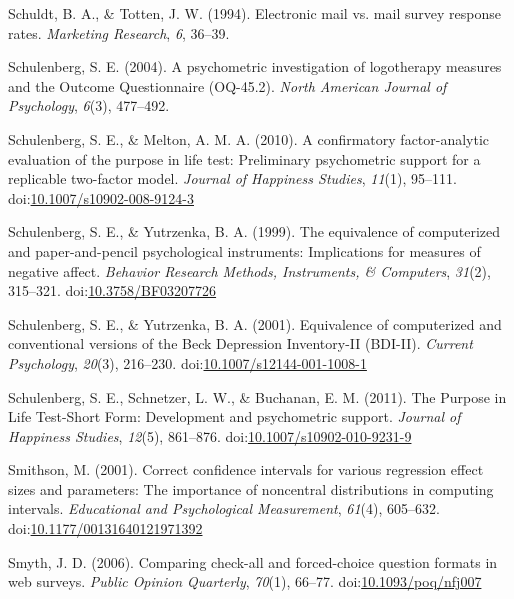 \documentclass[english,man]{apa6}
\theoremstyle{definition}
\theoremstyle{definition}
\theoremstyle{definition}
\theoremstyle{remark}
\begin{document}
\hypertarget{ref-Schuldt1994}{}
Schuldt, B. A., \& Totten, J. W. (1994). Electronic mail vs. mail survey
response rates. \emph{Marketing Research}, \emph{6}, 36--39.

\hypertarget{ref-Schulenberg2004}{}
Schulenberg, S. E. (2004). A psychometric investigation of logotherapy
measures and the Outcome Questionnaire (OQ-45.2). \emph{North American
Journal of Psychology}, \emph{6}(3), 477--492.

\hypertarget{ref-Schulenberg2010}{}
Schulenberg, S. E., \& Melton, A. M. A. (2010). A confirmatory
factor-analytic evaluation of the purpose in life test: Preliminary
psychometric support for a replicable two-factor model. \emph{Journal of
Happiness Studies}, \emph{11}(1), 95--111.
doi:\href{https://doi.org/10.1007/s10902-008-9124-3}{10.1007/s10902-008-9124-3}

\hypertarget{ref-Schulenberg1999}{}
Schulenberg, S. E., \& Yutrzenka, B. A. (1999). The equivalence of
computerized and paper-and-pencil psychological instruments:
Implications for measures of negative affect. \emph{Behavior Research
Methods, Instruments, \& Computers}, \emph{31}(2), 315--321.
doi:\href{https://doi.org/10.3758/BF03207726}{10.3758/BF03207726}

\hypertarget{ref-Schulenberg2001}{}
Schulenberg, S. E., \& Yutrzenka, B. A. (2001). Equivalence of
computerized and conventional versions of the Beck Depression
Inventory-II (BDI-II). \emph{Current Psychology}, \emph{20}(3),
216--230.
doi:\href{https://doi.org/10.1007/s12144-001-1008-1}{10.1007/s12144-001-1008-1}

\hypertarget{ref-Schulenberg2011}{}
Schulenberg, S. E., Schnetzer, L. W., \& Buchanan, E. M. (2011). The
Purpose in Life Test-Short Form: Development and psychometric support.
\emph{Journal of Happiness Studies}, \emph{12}(5), 861--876.
doi:\href{https://doi.org/10.1007/s10902-010-9231-9}{10.1007/s10902-010-9231-9}

\hypertarget{ref-Smithson2001}{}
Smithson, M. (2001). Correct confidence intervals for various regression
effect sizes and parameters: The importance of noncentral distributions
in computing intervals. \emph{Educational and Psychological
Measurement}, \emph{61}(4), 605--632.
doi:\href{https://doi.org/10.1177/00131640121971392}{10.1177/00131640121971392}

\hypertarget{ref-Smyth2006}{}
Smyth, J. D. (2006). Comparing check-all and forced-choice question
formats in web surveys. \emph{Public Opinion Quarterly}, \emph{70}(1),
66--77.
doi:\href{https://doi.org/10.1093/poq/nfj007}{10.1093/poq/nfj007}
\end{document}
